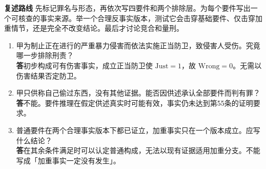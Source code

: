 \textbf{复述路线}\quad
先标记罪名与形态，再依次写四要件和两个排除层。为每个要件写出一个可核查的事实来源。举一个合理反事实版本，测试它会击穿基础要件、仅击穿加重情节，还是完全不改变结论。最后才讨论竞合和量刑。

\begin{enumerate}
\item 甲为制止正在进行的严重暴力侵害而依法实施正当防卫，致侵害人受伤。究竟哪一步排除刑责？\\
\textbf{答}\quad 初步构成可有伤害事实，成立正当防卫使 \(\mathrm{Just}=1\)，故 \(\mathrm{Wrong}=0\)。无需以伤害结果否定防卫。
\item 甲只供称自己偷过东西，没有其他证据。能否因供述承认全部要件而判有罪？\\
\textbf{答}\quad 不能。要件推理在假定供述真实时可能有效，事实仍未达到第55条的证明要求。
\item 普通要件在两个合理事实版本下都已证立，加重事实只在一个版本成立。应写什么结论？\\
\textbf{答}\quad 在其余条件满足时可以认定普通构成，无法以现有证据适用加重分支。不能写成「加重事实一定没有发生」。
\end{enumerate}
